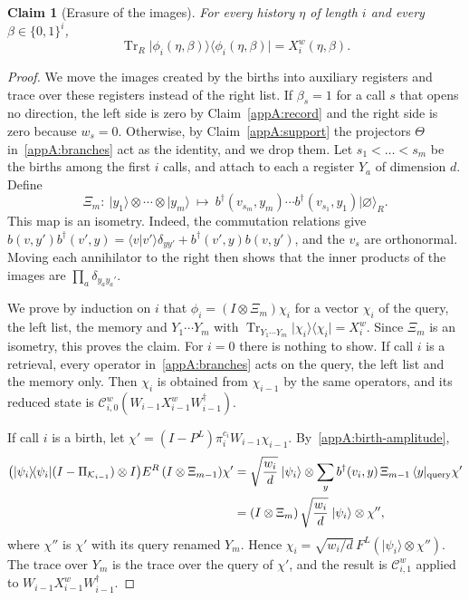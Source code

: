 \documentclass[11pt,letterpaper]{article}
\newtheorem{claim}[theorem]{Claim}
\theoremstyle{definition}\newtheorem{definition}[theorem]{Definition}
\newcommand{\Tr}{\operatorname{Tr}}
\newcommand{\ket}[1]{\lvert#1\rangle}
\newcommand{\bra}[1]{\langle#1\rvert}
\newcommand{\proj}[1]{\ket{#1}\!\bra{#1}}
\begin{document}
\begin{claim}[Erasure of the images]\label{appA:images}
For every history $\eta$ of length $i$ and every $\beta\in\{0,1\}^i$,
\[
 \Tr_R\proj{\phi_i(\eta,\beta)}=X^{w}_i(\eta,\beta).
\]
\end{claim}

\begin{proof}
We move the images created by the births into auxiliary registers and
trace over these registers instead of the right list.
If $\beta_s=1$ for a call $s$ that opens no direction, the left side
is zero by Claim~\ref{appA:record} and the right side is zero because
$w_s=0$. Otherwise, by Claim~\ref{appA:support} the projectors $\Theta$
in~\eqref{appA:branches} act as the identity, and we drop them. Let
$s_1<\dots<s_m$ be the births among the first
$i$ calls, and attach to each a register $Y_a$ of dimension $d$.
Define
\begin{equation}\label{eq:c6-mode-product}
 \Xi_m:\ \ket{y_1}\otimes\cdots\otimes\ket{y_m}\ \longmapsto\
       b^\dagger(v_{s_m},y_m)\cdots b^\dagger(v_{s_1},y_1)
       \ket{\varnothing}_R .
\end{equation}
This map is an isometry. Indeed, the commutation relations give
$b(v,y')b^\dagger(v',y)=\langle v|v'\rangle\delta_{yy'}
+b^\dagger(v',y)b(v,y')$, and the $v_s$ are orthonormal. Moving each
annihilator to the right then shows that the inner products of the images
are $\prod_a\delta_{y_ay_a'}$.

We prove by induction on $i$ that
$\phi_i=(I\otimes\Xi_m)\chi_i$ for a vector $\chi_i$ of the query, the
left list, the memory and $Y_1\cdots Y_m$ with
$\Tr_{Y_1\cdots Y_m}\proj{\chi_i}=X^{w}_i$. Since $\Xi_m$ is an
isometry, this proves the claim. For $i=0$ there is nothing to show.
If call $i$ is a retrieval, every operator
in~\eqref{appA:branches} acts on the query, the left list and the
memory only. Then $\chi_i$ is obtained from $\chi_{i-1}$ by the same
operators, and its reduced state is
$\mathcal C^{w}_{i,0}(W_{i-1}X^{w}_{i-1}W_{i-1}^\dagger)$.

If call $i$ is a birth, let
$\chi'=(I-P^L)\pi^{c_i}_iW_{i-1}\chi_{i-1}$.
By~\eqref{appA:birth-amplitude},
\begin{align*}
 \bigl(\proj{\psi_i}(I-\Pi_{\mathcal K_{i-1}})\otimes I\bigr)E^R
 \,(I\otimes\Xi_{m-1})\chi'
 &=\sqrt{\frac{w_i}{d}}\;\ket{\psi_i}\otimes
  \sum_y b^\dagger(v_i,y)\,\Xi_{m-1}\,\bra y_{\rm query}\chi'\\
 &=(I\otimes\Xi_m)\,\sqrt{\frac{w_i}{d}}\;\ket{\psi_i}\otimes\chi'',
\end{align*}
where $\chi''$ is $\chi'$ with its query renamed $Y_m$. Hence
$\chi_i=\sqrt{w_i/d}\,F^L(\ket{\psi_i}\otimes\chi'')$. The trace over
$Y_m$ is the trace over the query of $\chi'$, and the result is
$\mathcal C^{w}_{i,1}$ applied to $W_{i-1}X^{w}_{i-1}W_{i-1}^\dagger$.
\end{proof}
\end{document}
